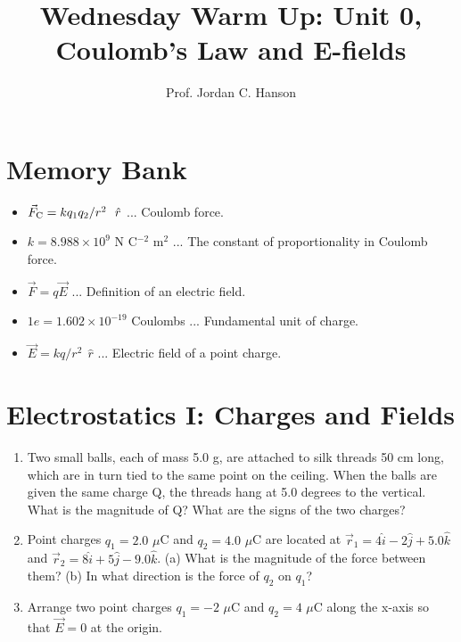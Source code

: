 \documentclass{article}
\begin{document}
\twocolumn

\title{Wednesday Warm Up: Unit 0, Coulomb's Law and E-fields}
\author{Prof. Jordan C. Hanson}

\maketitle

\section{Memory Bank}

\begin{itemize}
\item $\vec{F}_{\rm C} = k q_1 q_2 / r^2 ~~\hat{r}$ ... Coulomb force.
\item $k = 8.988 \times 10^{9}$ N C$^{-2}$ m$^{2}$ ... The constant of proportionality in Coulomb force.
\item $\vec{F} = q\vec{E}$ ... Definition of an electric field.
\item $1e = 1.602 \times 10^{-19}$ Coulombs ... Fundamental unit of charge.
\item $\vec{E} = k q/r^2 ~~\hat{r}$ ... Electric field of a point charge.
\end{itemize}

\section{Electrostatics I: Charges and Fields}

\begin{enumerate}
\item Two small balls, each of mass 5.0 g, are attached to silk threads 50 cm long, which are in turn tied to the same point on the ceiling. When the balls are given the same charge Q, the threads hang at 5.0 degrees to the vertical. What is the magnitude of Q? What are the signs of the two charges? \\ \vspace{4cm}
\item Point charges $q_1 = 2.0$ $\mu$C and $q_2 = 4.0$ $\mu$C are located at $\vec{r}_1 = 4\hat{i} - 2\hat{j} + 5.0\hat{k}$ and $\vec{r}_2 = 8\hat{i} + 5\hat{j} - 9.0\hat{k}$.  (a) What is the magnitude of the force between them? (b) In what direction is the force of $q_2$ on $q_1$? \\ \vspace{4cm}
\item Arrange two point charges $q_1 = -2$ $\mu$C and $q_2 = 4$ $\mu$C along the x-axis so that $\vec{E}=0$ at the origin. \\ \vspace{3cm}
\end{enumerate}
\end{document}
